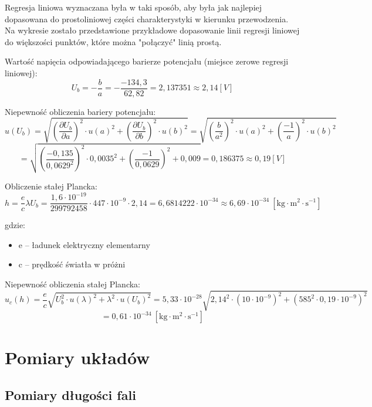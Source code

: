 \documentclass[12pt]{article}
\newcommand{\dpartial}[2]{\frac{\partial #1}{\partial #2}}
\newcommand{\physdpartial}[2]{\left( \dpartial{#1}{#2} \right)^2}
\newcommand{\powfrac}[2]{\left( \frac{#1}{#2} \right)^2}
\begin{document}
Regresja liniowa wyznaczana była w taki sposób, aby była jak najlepiej dopasowana do prostoliniowej części charakterystyki w kierunku przewodzenia.
Na wykresie zostało przedstawione przykładowe dopasowanie linii regresji liniowej do większości punktów, które można "połączyć" linią prostą.
\smallskip

Wartość napięcia odpowiadającego barierze potencjału (miejsce zerowe regresji liniowej):
\[ U_b = -\frac{b}{a} = -\frac{-134,3}{62,82} = 2,137351 \approx 2,14[V] \]
\medskip

Niepewność obliczenia bariery potencjału:
\[ u(U_b) = \sqrt{ \physdpartial{U_b}{a} \cdot u(a)^2 + \physdpartial{U_b}{b} \cdot u(b)^2 } = \sqrt{ \powfrac{b}{a^2} \cdot u(a)^2 + \powfrac{-1}{a} \cdot u(b)^2 } \]
\[ = \sqrt{ \powfrac{-0,135}{0,0629^2} \cdot 0,0035^2 + \powfrac{-1}{0,0629} + 0,009 } = 0,186375 \approx 0,19[V] \]
\medskip

Obliczenie stałej Plancka:
\[ h = \frac{e}{c} \lambda U_b = \frac{1,6 \cdot 10^{-19}}{299792458} \cdot 447 \cdot 10^{-9} \cdot 2,14 = 6,6814222 \cdot 10^{-34} \approx 6,69 \cdot 10^{-34} \ [\textrm{kg} \cdot \textrm{m}^2 \cdot \textrm{s}^{-1}] \]
\medskip

gdzie:
\begin{itemize}
    \item e -- ładunek elektryczny elementarny
    \item c -- prędkość światła w próżni
\end{itemize}
\medskip

Niepewność obliczenia stałej Plancka:
\[ u_c(h) = \frac{e}{c} \sqrt{ U_b^2 \cdot u(\lambda)^2 + \lambda^2 \cdot u(U_b)^2 } = 5,33 \cdot 10^{-28} \sqrt{ 2,14^2 \cdot (10 \cdot 10^{-9})^2 + (585^2 \cdot 0,19 \cdot 10^{-9})^2 } \]
\[ = 0,61 \cdot 10^{-34} \ [\textrm{kg} \cdot \textrm{m}^2 \cdot \textrm{s}^{-1}] \]

\pagebreak

\section{Pomiary układów}

\subsection{Pomiary długości fali}
\end{document}
